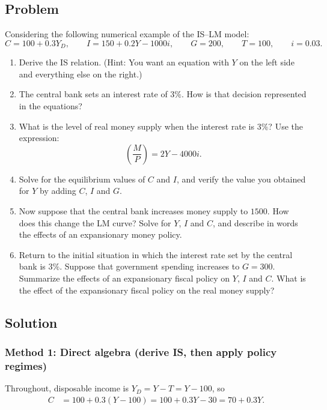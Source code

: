 \documentclass[12pt]{article}
\begin{document}
\subsection*{Problem}
Considering the following numerical example of the IS--LM model:
\[
C = 100 + 0.3Y_D,\qquad
I = 150 + 0.2Y - 1000i,\qquad
G = 200,\qquad
T = 100,\qquad
i = 0.03.
\]
\begin{enumerate}[label=(\alph*)]
  \item Derive the IS relation. (Hint: You want an equation with \(Y\) on the left side and everything else on the right.)
  \item The central bank sets an interest rate of \(3\%\). How is that decision represented in the equations?
  \item What is the level of real money supply when the interest rate is \(3\%\)? Use the expression:
  \[
  \left(\frac{M}{P}\right) = 2Y - 4000i.
  \]
  \item Solve for the equilibrium values of \(C\) and \(I\), and verify the value you obtained for \(Y\) by adding \(C\), \(I\) and \(G\).
  \item Now suppose that the central bank increases money supply to \(1500\). How does this change the LM curve? Solve for \(Y\), \(I\) and \(C\), and describe in words the effects of an expansionary money policy.
  \item Return to the initial situation in which the interest rate set by the central bank is \(3\%\). Suppose that government spending increases to \(G=300\). Summarize the effects of an expansionary fiscal policy on \(Y\), \(I\) and \(C\). What is the effect of the expansionary fiscal policy on the real money supply?
\end{enumerate}

\subsection*{Solution}

\subsubsection*{Method 1: Direct algebra (derive IS, then apply policy regimes)}
Throughout, disposable income is \(Y_D=Y-T=Y-100\), so
\begin{align*}
C &= 100 + 0.3(Y-100)
= 100 + 0.3Y - 30
= 70 + 0.3Y.
\end{align*}
\end{document}
